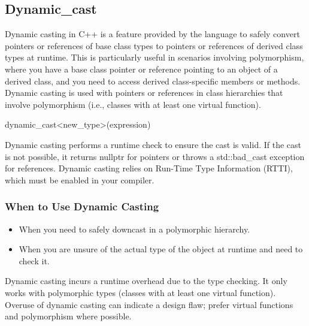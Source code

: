 \documentclass{report}
\begin{document}
    \subsection{Dynamic\_cast}
    \bigbreak \noindent 
    Dynamic casting in C++ is a feature provided by the language to safely convert pointers or references of base class types to pointers or references of derived class types at runtime. This is particularly useful in scenarios involving polymorphism, where you have a base class pointer or reference pointing to an object of a derived class, and you need to access derived class-specific members or methods.
    \bigbreak \noindent 
    Dynamic casting is used with pointers or references in class hierarchies that involve polymorphism (i.e., classes with at least one virtual function).
    \bigbreak \noindent 
    \begin{cppcode}
    dynamic_cast<new_type>(expression)
    \end{cppcode}
    \bigbreak \noindent 
    Dynamic casting performs a runtime check to ensure the cast is valid. If the cast is not possible, it returns nullptr for pointers or throws a std::bad\_cast exception for references.
    \bigbreak \noindent 
    Dynamic casting relies on Run-Time Type Information (RTTI), which must be enabled in your compiler.
    \bigbreak \noindent 
    \subsubsection{When to Use Dynamic Casting}
    \bigbreak \noindent 
    \begin{itemize}
        \item When you need to safely downcast in a polymorphic hierarchy.
        \item When you are unsure of the actual type of the object at runtime and need to check it.
    \end{itemize}
    \bigbreak \noindent 
    Dynamic casting incurs a runtime overhead due to the type checking. It only works with polymorphic types (classes with at least one virtual function).
    \bigbreak \noindent 
    Overuse of dynamic casting can indicate a design flaw; prefer virtual functions and polymorphism where possible.

    \bigbreak \noindent 
\end{document}
